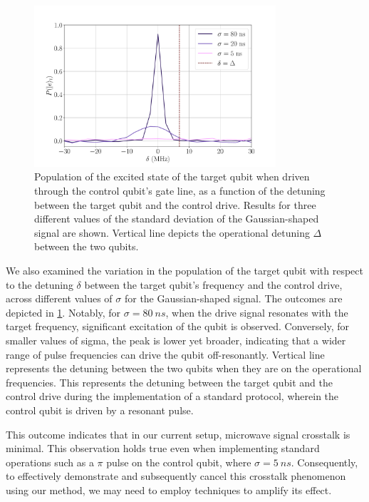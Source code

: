 \begin{figure}
    \centering
    \includegraphics[width=0.8\textwidth]{Images//Chap2.0/detunings.pdf}
    \caption{Population of the excited state of the target qubit when driven through the control qubit's gate line, as a function of the detuning between the target qubit and the control drive. Results for three different values of the standard deviation of the Gaussian-shaped signal are shown. Vertical line depicts the operational detuning $\Delta$ between the two qubits.}
    \label{fig:detunings}
\end{figure}

We also examined the variation in the population of the target qubit with respect to the detuning $\delta$ between the target qubit's frequency and the control drive, across different values of $\sigma$ for the Gaussian-shaped signal. 
The outcomes are depicted in \cref{fig:detunings}.
Notably, for $\sigma = \SI{80}{ns}$, when the drive signal resonates with the target frequency, significant excitation of the qubit is observed.
Conversely, for smaller values of sigma, the peak is lower yet broader, indicating that a wider range of pulse frequencies can drive the qubit off-resonantly.
Vertical line represents the detuning between the two qubits when they are on the operational frequencies.
This represents the detuning between the target qubit and the control drive during the implementation of a standard protocol, wherein the control qubit is driven by a resonant pulse.

This outcome indicates that in our current setup, microwave signal crosstalk is minimal.
This observation holds true even when implementing standard operations such as a $\pi$ pulse on the control qubit, where $\sigma = \SI{5}{ns}$. 
Consequently, to effectively demonstrate and subsequently cancel this crosstalk phenomenon using our method, we may need to employ techniques to amplify its effect.

